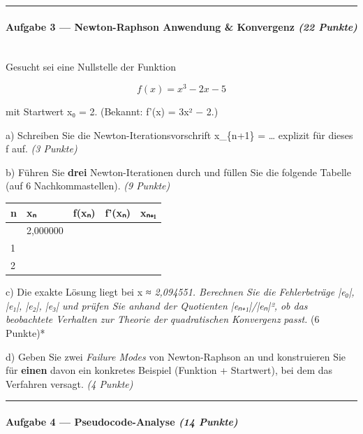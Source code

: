 \documentclass[11pt, a4paper]{article}
\begin{document}
\noindent\textcolor{rulegray}{\rule{\linewidth}{0.4pt}}


\paragraph{Aufgabe 3 — Newton-Raphson Anwendung \& Konvergenz \textit{(22 Punkte)}}\mbox{}\\[2pt]

Gesucht sei eine Nullstelle der Funktion


\[
f(x) = x^3 - 2x - 5
\]


mit Startwert x₀ = 2. (Bekannt: f'(x) = 3x² − 2.)


a) Schreiben Sie die Newton-Iterationsvorschrift x\_\{n+1\} = … explizit für dieses f auf. \textit{(3 Punkte)}


b) Führen Sie \textbf{drei} Newton-Iterationen durch und füllen Sie die folgende Tabelle (auf 6 Nachkommastellen). \textit{(9 Punkte)}



{\small
\begin{tabularx}{\linewidth}{XXXXX}
\hline
\rowcolor{tableheadbg}
{\color{white}\textbf{n}} & {\color{white}\textbf{xₙ}} & {\color{white}\textbf{f(xₙ)}} & {\color{white}\textbf{f'(xₙ)}} & {\color{white}\textbf{xₙ₊₁}} \\[2pt]
\hline
\endhead
\hline
\endfoot
0 & 2,000000 &  &  &  \\
1 &  &  &  &  \\
2 &  &  &  &  \\
\end{tabularx}
}


c) Die exakte Lösung liegt bei x\textit{ ≈ 2,094551. Berechnen Sie die Fehlerbeträge |e₀|, |e₁|, |e₂|, |e₃| und prüfen Sie anhand der Quotienten |eₙ₊₁|/|eₙ|², ob das beobachtete Verhalten zur Theorie der }\textit{quadratischen Konvergenz}\textit{ passt. }(6 Punkte)*


d) Geben Sie zwei \textit{Failure Modes} von Newton-Raphson an und konstruieren Sie für \textbf{einen} davon ein konkretes Beispiel (Funktion + Startwert), bei dem das Verfahren versagt. \textit{(4 Punkte)}



\noindent\textcolor{rulegray}{\rule{\linewidth}{0.4pt}}


\paragraph{Aufgabe 4 — Pseudocode-Analyse \textit{(14 Punkte)}}\mbox{}\\[2pt]
\end{document}
